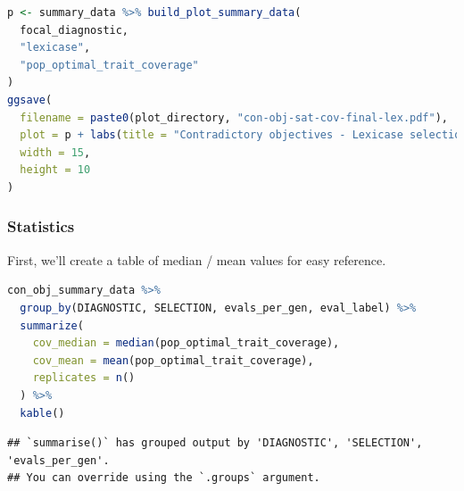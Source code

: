 \documentclass[
]{book}
\begin{document}
\begin{lstlisting}[language=R]
p <- summary_data %>% build_plot_summary_data(
  focal_diagnostic,
  "lexicase",
  "pop_optimal_trait_coverage"
)
ggsave(
  filename = paste0(plot_directory, "con-obj-sat-cov-final-lex.pdf"),
  plot = p + labs(title = "Contradictory objectives - Lexicase selection"),
  width = 15,
  height = 10
)
\end{lstlisting}

\hypertarget{statistics}{%
\subsubsection{Statistics}\label{statistics}}

First, we'll create a table of median / mean values for easy reference.

\begin{lstlisting}[language=R]
con_obj_summary_data %>%
  group_by(DIAGNOSTIC, SELECTION, evals_per_gen, eval_label) %>%
  summarize(
    cov_median = median(pop_optimal_trait_coverage),
    cov_mean = mean(pop_optimal_trait_coverage),
    replicates = n()
  ) %>%
  kable()
\end{lstlisting}

\begin{lstlisting}
## `summarise()` has grouped output by 'DIAGNOSTIC', 'SELECTION', 'evals_per_gen'.
## You can override using the `.groups` argument.
\end{lstlisting}
\end{document}
